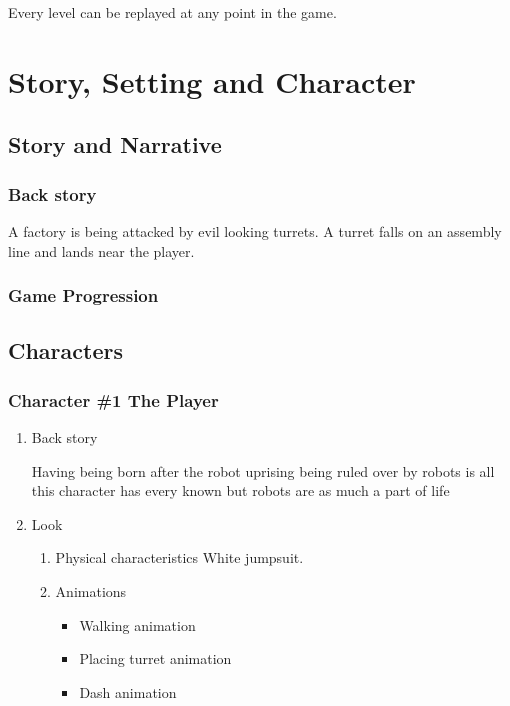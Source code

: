 \documentclass{article}
\begin{document}
Every level can be replayed at any point in the game.
\section{Story, Setting and Character}
\label{sec:org645f0c3}
\subsection{Story and Narrative}
\label{sec:orge1c9e0b}
\subsubsection{Back story}
\label{sec:org86154c9}
A factory is being attacked by evil looking turrets.
A turret falls on an assembly line and lands near the player.
\subsubsection{Game Progression}
\label{sec:org6195c19}
\subsection{Characters}
\label{sec:orgf0c7123}
\subsubsection{Character \#1 The Player}
\label{sec:org872b69b}
\begin{enumerate}
\item Back story
\label{sec:orgab2620d}

Having being born after the robot uprising being ruled over by robots is all this character has every known
but robots are as much a part of life
\item Look
\label{sec:org96aa3f2}

\begin{enumerate}
\item Physical characteristics
\label{sec:orgd0fe9fb}
White jumpsuit.
\item Animations
\label{sec:org189f49b}

\begin{itemize}
\item Walking animation
\item Placing turret animation
\item Dash animation
\end{itemize}
\end{enumerate}
\end{enumerate}
\end{document}
